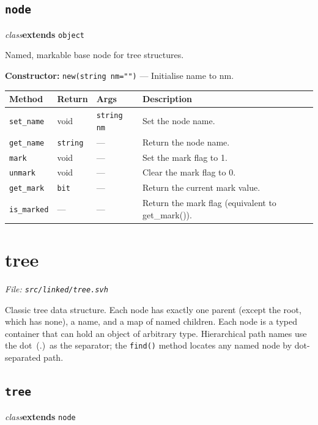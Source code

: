 \documentclass[11pt,letterpaper]{report}
\begin{document}
\subsection*{\texttt{node}}
\noindent\small\textit{class}\quad \textbf{extends} \texttt{object}\par

Named, markable base node for tree structures.

\noindent\textbf{Constructor:} \texttt{new(string nm="")} --- Initialise name to nm.

\begin{xltabular}{\linewidth}{>{\small}p{1.35in} >{\small}p{1.25in} >{\small}p{0.95in} >{\small}X}
\toprule
\textbf{Method} & \textbf{Return} & \textbf{Args} & \textbf{Description} \\
\midrule
\endhead
\bottomrule
\endfoot
\texttt{set\_name} & void & \texttt{string nm} & Set the node name. \\
\texttt{get\_name} & \texttt{string} & --- & Return the node name. \\
\texttt{mark} & void & --- & Set the mark flag to 1. \\
\texttt{unmark} & void & --- & Clear the mark flag to 0. \\
\texttt{get\_mark} & \texttt{bit} & --- & Return the current mark value. \\
\texttt{is\_marked} & --- & --- & Return the mark flag (equivalent to get\_mark()). \\
\end{xltabular}

\section{tree}
\noindent\small\textit{File: \texttt{src/linked/tree.svh}}\par

Classic tree data structure. Each node has exactly one parent (except the root, which has none), a name, and a map of named children. Each node is a typed container that can hold an object of arbitrary type. Hierarchical path names use the dot~(.)~as the separator; the \texttt{find()} method locates any named node by dot-separated path.

\subsection*{\texttt{tree}}
\noindent\small\textit{class}\quad \textbf{extends} \texttt{node}\par
\end{document}
